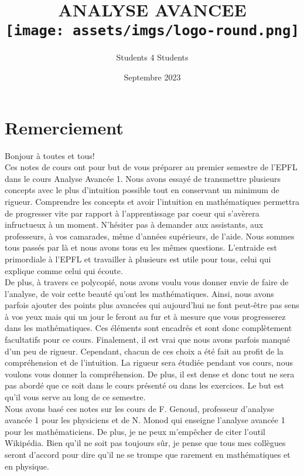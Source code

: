 \documentclass[oneside,12pt,french,table]{book}
\title{
    ANALYSE AVANCEE\\ \vspace{0.5cm}
    \texttt{[image: assets/imgs/logo-round.png]}
}
\author{Students 4 Students}
\date{Septembre 2023}
\theoremstyle{definition}
\theoremstyle{plain}
\theoremstyle{remark}
\begin{document}
\maketitle

\tableofcontents

\setcounter{chapter}{-1}
\chapter{Remerciement}
Bonjour à toutes et tous!\\

Ces notes de cours ont pour but de vous préparer au premier semestre de l'EPFL dans le cours Analyse Avancée 1. Nous avons essayé de transmettre plusieurs concepts avec le plus d'intuition possible tout en conservant un minimum de rigueur. Comprendre les concepts et avoir l'intuition en mathématiques permettra de progresser vite par rapport à l'apprentissage par coeur qui s'avèrera infructueux à un moment. N'hésiter pas à demander aux assistants, aux professeurs, à vos camarades, même d'années supérieurs, de l'aide. Nous sommes tous passés par là et nous avons tous eu les mêmes questions. L'entraide est primordiale à l'EPFL et travailler à plusieurs est utile pour tous, celui qui explique comme celui qui écoute.\\ 

De plus, à travers ce polycopié, nous avons voulu vous donner envie de faire de l'analyse, de voir cette beauté qu'ont les mathématiques. Ainsi, nous avons parfois ajouter des points plus avancées qui aujourd'hui ne font peut-être pas sens à vos yeux mais qui un jour le feront au fur et à mesure que vous progresserez dans les mathématiques. Ces éléments sont encadrés et sont donc complètement facultatifs pour ce cours. Finalement, il est vrai que nous avons parfois manqué d'un peu de rigueur. Cependant, chacun de ces choix a été fait au profit de la compréhension et de l'intuition. La rigueur sera étudiée pendant vos cours, nous voulons vous donner la compréhension. De plus, il est dense et donc tout ne sera pas abordé que ce soit dans le cours présenté ou dans les exercices. Le but est qu'il vous serve au long de ce semestre.\\

Nous avons basé ces notes sur les cours de F. Genoud, professeur d'analyse avancée 1 pour les physiciens et 
de N. Monod qui enseigne l'analyse avancée 1 pour les mathématiciens. De plus, je ne peux m'empêcher de citer l'outil Wikipédia. Bien qu'il ne soit pas toujours sûr, je pense que tous mes collègues seront d'accord pour dire qu'il ne se trompe que rarement en mathématiques et en physique. \\
\end{document}
